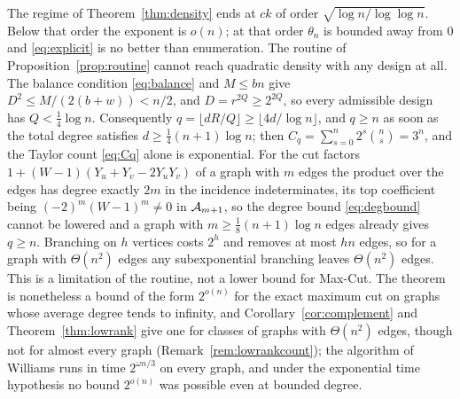 \begin{remark}\label{rem:densityend}
The regime of Theorem~\ref{thm:density} ends at $ck$ of order
$\sqrt{\log n/\log\log n}$. Below that order the exponent is $o(n)$; at that order
$\theta_n$ is bounded away from $0$ and \eqref{eq:explicit} is no better than
enumeration. The routine of Proposition~\ref{prop:routine} cannot reach quadratic
density with any design at all. The balance condition \eqref{eq:balance} and
$M\le bn$ give $D^2\le M/(2(b+w))<n/2$, and $D=r^{2Q}\ge2^{2Q}$, so every admissible
design has $Q<\frac14\log n$. Consequently $q=\lfloor dR/Q\rfloor\ge\lfloor4d/\log n\rfloor$,
and $q\ge n$ as soon as the total degree satisfies $d\ge\frac14(n+1)\log n$; then
$C_q=\sum_{s=0}^n2^s\binom ns=3^n$, and the Taylor count \eqref{eq:Cq} alone is
exponential. For the cut factors $1+(W-1)(Y_u+Y_v-2Y_uY_v)$ of a graph with $m$ edges
the product over the edges has degree exactly $2m$ in the incidence indeterminates,
its top coefficient being $(-2)^m(W-1)^m\ne0$ in $\mathcal{A}_{m+1}$, so the degree bound
\eqref{eq:degbound} cannot be lowered and a graph with $m\ge\frac18(n+1)\log n$
edges already gives $q\ge n$. Branching on $h$ vertices costs $2^h$ and removes at
most $hn$ edges, so for a graph with $\Theta(n^2)$ edges any subexponential branching
leaves $\Theta(n^2)$ edges. This is a limitation of the routine, not a lower bound for
Max-Cut. The theorem is nonetheless a bound of the form $2^{o(n)}$ for the exact
maximum cut on graphs whose average degree tends to infinity, and
Corollary~\ref{cor:complement} and Theorem~\ref{thm:lowrank} give one for classes of
graphs with $\Theta(n^2)$ edges, though not for almost every graph
(Remark~\ref{rem:lowrankcount}); the algorithm of Williams \cite{Wil05} runs in time $2^{\omega n/3}$ on every
graph, and under the exponential time hypothesis no bound $2^{o(n)}$ was possible
even at bounded degree.
\end{remark}
